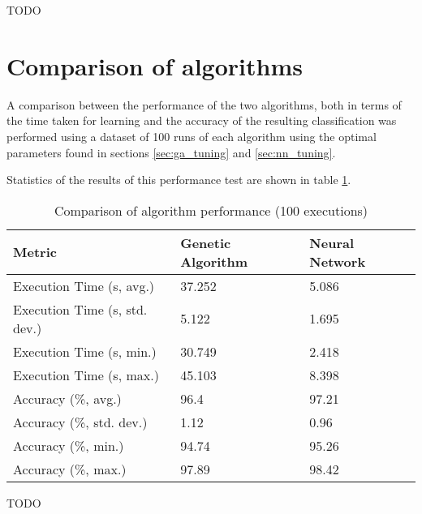 \documentclass[a4paper]{article}
\begin{document}
TODO

\section{Comparison of algorithms}
\label{sec:comparison}

A comparison between the performance of the two algorithms, both in terms of the
time taken for learning and the accuracy of the resulting classification was
performed using a dataset of 100 runs of each algorithm using the optimal
parameters found in sections \ref{sec:ga_tuning} and \ref{sec:nn_tuning}.

Statistics of the results of this performance test are shown in table
\ref{tab:comparison_avg}.

\begin{table}[h!]
  \centering
  \begin{tabular}{@{}lll@{}}
    \toprule
    Metric                        & Genetic Algorithm & Neural Network \\
    \midrule
    Execution Time (s, avg.)      & 37.252            & 5.086          \\
    Execution Time (s, std. dev.) & 5.122             & 1.695          \\
    Execution Time (s, min.)      & 30.749            & 2.418          \\
    Execution Time (s, max.)      & 45.103            & 8.398          \\
    Accuracy (\%, avg.)           & 96.4              & 97.21          \\
    Accuracy (\%, std. dev.)      & 1.12              & 0.96           \\
    Accuracy (\%, min.)           & 94.74             & 95.26          \\
    Accuracy (\%, max.)           & 97.89             & 98.42          \\
    \bottomrule
  \end{tabular}
  \caption{Comparison of algorithm performance (100 executions)}
  \label{tab:comparison_avg}
\end{table}

TODO

\printbibliography
\end{document}

